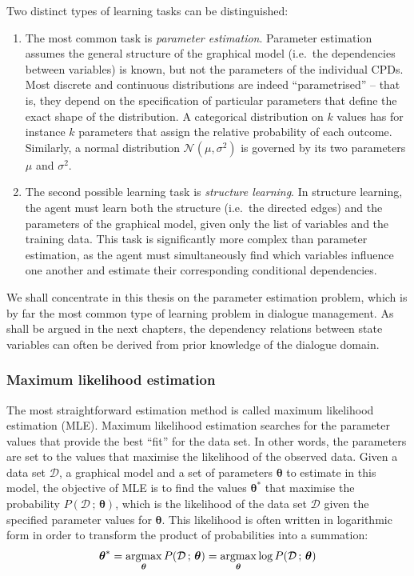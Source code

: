 Two distinct types of learning tasks can be distinguished:
\begin{enumerate}
\item The most common task is \textit{parameter estimation}.  Parameter estimation assumes the general structure of the graphical model (i.e.\ the dependencies between variables) is known, but not the parameters of the individual CPDs. Most discrete and continuous distributions are indeed ``parametrised'' -- that is, they depend on the specification of particular parameters that define the exact shape of the distribution. A categorical distribution on $k$ values has for instance $k$ parameters that assign the relative probability of each outcome.  Similarly, a normal distribution $\mathcal{N}(\mu,\sigma^2)$ is governed by its two parameters $\mu$ and $\sigma^2$. 

\item The second possible learning task is \textit{structure learning}.  In structure learning, the agent must learn both the structure (i.e.\ the directed edges) and the parameters of the graphical model, given only the list of variables and the training data.  This task is significantly more complex than parameter estimation, as the agent must simultaneously find which variables influence one another and estimate their corresponding conditional dependencies. 
\end{enumerate}

We shall concentrate in this thesis on the parameter estimation problem, which is by far the most common type of learning problem in dialogue management. As shall be argued in the next chapters, the dependency relations between state variables can often be derived from prior knowledge of the dialogue domain.

\subsubsection*{Maximum likelihood estimation}
The most straightforward estimation method is called maximum likelihood estimation (MLE). Maximum likelihood estimation searches for the parameter values that provide the best ``fit'' for the data set.  In other words, the parameters are set to the values that maximise the likelihood of the observed data.  Given a data set $\mathcal{D}$, a graphical model and a set of parameters $\boldsymbol\theta$ to estimate in this model, the objective of MLE is to find the values $\boldsymbol\theta^*$  that maximise the probability $P(\mathcal{D} \, ;  \, \boldsymbol\theta)$, which is the likelihood of the data set $\mathcal{D}$ given the specified parameter values for $\boldsymbol\theta$. This likelihood is often written in logarithmic form in order to transform the product of probabilities into a summation: 
\begin{equation}
\boldsymbol\theta^* = \argmax_{\boldsymbol\theta} P(\mathcal{D}  \, ; \, \boldsymbol\theta) = \argmax_{\boldsymbol\theta} \log P(\mathcal{D}  \,  ;  \, \boldsymbol\theta)
\end{equation}


